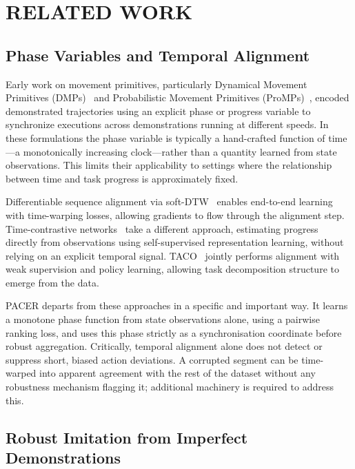 \documentclass[a4paper, 10pt, conference]{ieeeconf}
\begin{document}
\section{RELATED WORK}

\subsection{Phase Variables and Temporal Alignment}

Early work on movement primitives, particularly Dynamical Movement Primitives (DMPs)~\cite{ijspeert2013dmp} and Probabilistic Movement Primitives (ProMPs)~\cite{paraschos2013promp}, encoded demonstrated trajectories using an explicit phase or progress variable to synchronize executions across demonstrations running at different speeds.
In these formulations the phase variable is typically a hand-crafted function of time---a monotonically increasing clock---rather than a quantity learned from state observations.
This limits their applicability to settings where the relationship between time and task progress is approximately fixed.

Differentiable sequence alignment via soft-DTW~\cite{cuturi2017softdtw} enables end-to-end learning with time-warping losses, allowing gradients to flow through the alignment step.
Time-contrastive networks~\cite{sermanet2018tcn} take a different approach, estimating progress directly from observations using self-supervised representation learning, without relying on an explicit temporal signal.
TACO~\cite{shiarlis2018taco} jointly performs alignment with weak supervision and policy learning, allowing task decomposition structure to emerge from the data.

PACER departs from these approaches in a specific and important way.
It learns a monotone phase function from state observations alone, using a pairwise ranking loss, and uses this phase strictly as a synchronisation coordinate before robust aggregation.
Critically, temporal alignment alone does not detect or suppress short, biased action deviations.
A corrupted segment can be time-warped into apparent agreement with the rest of the dataset without any robustness mechanism flagging it; additional machinery is required to address this.

\subsection{Robust Imitation from Imperfect Demonstrations}
\end{document}
